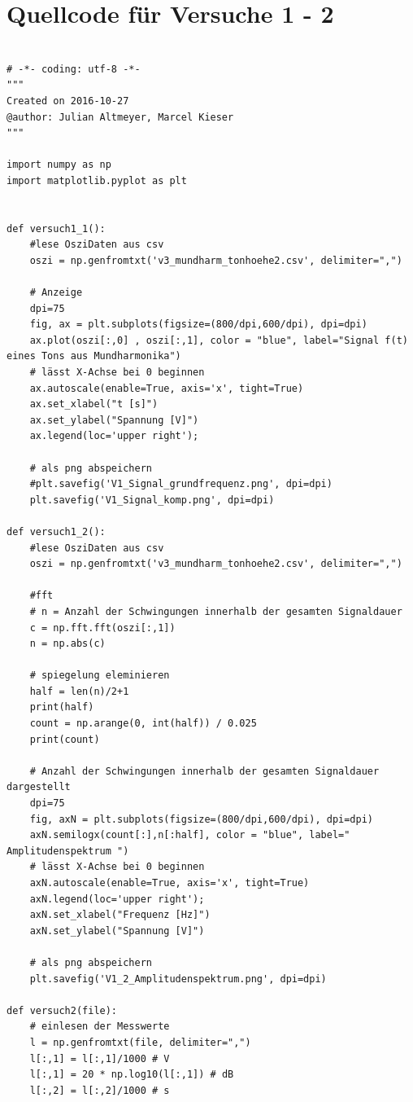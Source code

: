 \documentclass[12pt,oneside,a4paper]{report}
\begin{document}
\section{Quellcode für Versuche 1 - 2}
\label{chap:APPENDIX_SOURCECODE}
\begin{lstlisting}[style=PYTHON, frame=single, caption=QuellCodeV1 bis V2, captionpos=b, label=lst:Code]

# -*- coding: utf-8 -*-
"""
Created on 2016-10-27
@author: Julian Altmeyer, Marcel Kieser
"""

import numpy as np
import matplotlib.pyplot as plt


def versuch1_1():
    #lese OsziDaten aus csv
    oszi = np.genfromtxt('v3_mundharm_tonhoehe2.csv', delimiter=",")
    
    # Anzeige
    dpi=75
    fig, ax = plt.subplots(figsize=(800/dpi,600/dpi), dpi=dpi)
    ax.plot(oszi[:,0] , oszi[:,1], color = "blue", label="Signal f(t) eines Tons aus Mundharmonika")
    # lässt X-Achse bei 0 beginnen
    ax.autoscale(enable=True, axis='x', tight=True)
    ax.set_xlabel("t [s]")
    ax.set_ylabel("Spannung [V]")
    ax.legend(loc='upper right');
    
    # als png abspeichern
    #plt.savefig('V1_Signal_grundfrequenz.png', dpi=dpi)
    plt.savefig('V1_Signal_komp.png', dpi=dpi)

def versuch1_2():
    #lese OsziDaten aus csv
    oszi = np.genfromtxt('v3_mundharm_tonhoehe2.csv', delimiter=",")
    
    #fft
    # n = Anzahl der Schwingungen innerhalb der gesamten Signaldauer
    c = np.fft.fft(oszi[:,1])
    n = np.abs(c)
    
    # spiegelung eleminieren
    half = len(n)/2+1
    print(half)
    count = np.arange(0, int(half)) / 0.025
    print(count)
    
    # Anzahl der Schwingungen innerhalb der gesamten Signaldauer dargestellt
    dpi=75
    fig, axN = plt.subplots(figsize=(800/dpi,600/dpi), dpi=dpi)
    axN.semilogx(count[:],n[:half], color = "blue", label=" Amplitudenspektrum ")
    # lässt X-Achse bei 0 beginnen
    axN.autoscale(enable=True, axis='x', tight=True)
    axN.legend(loc='upper right');
    axN.set_xlabel("Frequenz [Hz]")
    axN.set_ylabel("Spannung [V]")
    
    # als png abspeichern    
    plt.savefig('V1_2_Amplitudenspektrum.png', dpi=dpi)

def versuch2(file):
    # einlesen der Messwerte
    l = np.genfromtxt(file, delimiter=",")
    l[:,1] = l[:,1]/1000 # V
    l[:,1] = 20 * np.log10(l[:,1]) # dB
    l[:,2] = l[:,2]/1000 # s


\end{lstlisting}
\end{document}
